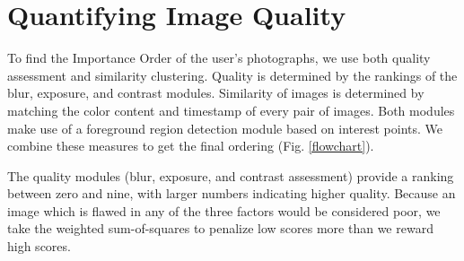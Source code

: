 \documentclass{article}
\begin{document}


\section{Quantifying Image Quality}
\begin{figure*}
  \centering
  \caption{Interest points are used to find the foreground subject. Blur, contrast, and exposure assessment algorithms are used to calculate an image's quality rating. Images are clustered into groups of similar images based on their histograms, color distribution, and timestamps. A reordering of the input results, allowing the user to remove images at the end of this ordering.}
  \label{flowchart}
\end{figure*}

To find the Importance Order of the user's photographs, we use both quality assessment and similarity clustering. Quality is determined by the rankings of the blur, exposure, and contrast modules. Similarity of images is determined by matching the color content and timestamp of every pair of images. Both modules make use of a foreground region detection module based on interest points. We combine these measures to get the final ordering (Fig. \ref{flowchart}).

The quality modules (blur, exposure, and contrast assessment) provide a ranking between zero and nine, with larger numbers indicating higher quality. Because an image which is flawed in any of the three factors would be considered poor, we take the weighted sum-of-squares to penalize low scores more than we reward high scores.
\end{document}

